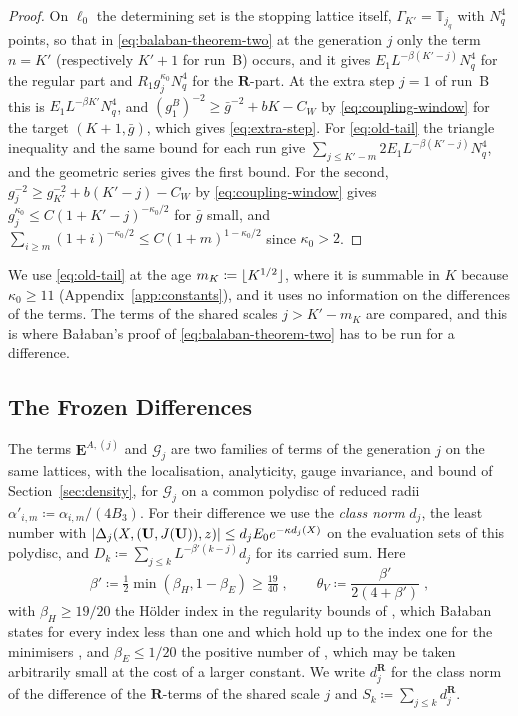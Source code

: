 \documentclass[11pt]{preprint}
\DeclarePairedDelimiter{\abs}{\lvert}{\rvert}
\DeclarePairedDelimiter{\floor}{\lfloor}{\rfloor}
\numberwithin{equation}{section}
\theoremstyle{definition}
\theoremstyle{remark}
\theoremstyle{plain}
\begin{document}
\begin{proof}
On $\ell_0$ the determining set is the stopping lattice itself, $\Gamma_{K'} = \mathbb T_{j_q}$ with $N_q^4$ points, so that in \eqref{eq:balaban-theorem-two} at the generation $j$ only the term $n = K'$ (respectively $K' + 1$ for run~B) occurs, and it gives $E_1L^{-\beta(K'-j)}N_q^4$ for the regular part and $R_1g_j^{\kappa_0}N_q^4$ for the $\mathbf R$-part. At the extra step $j = 1$ of run~B this is $E_1L^{-\beta K'}N_q^4$, and $(g^B_1)^{-2} \geq \bar g^{-2} + bK - C_W$ by \eqref{eq:coupling-window} for the target $(K + 1, \bar g)$, which gives \eqref{eq:extra-step}. For \eqref{eq:old-tail} the triangle inequality and the same bound for each run give $\sum_{j \leq K'-m}2E_1L^{-\beta(K'-j)}N_q^4$, and the geometric series gives the first bound. For the second, $g_j^{-2} \geq g_{K'}^{-2} + b(K' - j) - C_W$ by \eqref{eq:coupling-window} gives $g_j^{\kappa_0} \leq C(1 + K' - j)^{-\kappa_0/2}$ for $\bar g$ small, and $\sum_{i \geq m}(1 + i)^{-\kappa_0/2} \leq C(1 + m)^{1-\kappa_0/2}$ since $\kappa_0 > 2$.
\end{proof}

We use \eqref{eq:old-tail} at the age $m_K \coloneqq \floor{K^{1/2}}$, where it is summable in $K$ because $\kappa_0 \geq 11$ (Appendix~\ref{app:constants}), and it uses no information on the differences of the terms. The terms of the shared scales $j > K' - m_K$ are compared, and this is where Ba{\l}aban's proof of \eqref{eq:balaban-theorem-two} has to be run for a difference.

\subsection{The Frozen Differences}\label{sec:frozen-differences}

The terms $\mathbf E^{A,(j)}$ and $\mathcal G_j$ are two families of terms of the generation $j$ on the same lattices, with the localisation, analyticity, gauge invariance, and bound of Section~\ref{sec:density}, for $\mathcal G_j$ on a common polydisc of reduced radii $\alpha'_{i,m} \coloneqq \alpha_{i,m}/(4B_3)$. For their difference we use the \emph{class norm} $d_j$, the least number with $\abs{\Delta_j(X, (\mathbf U, J(\mathbf U)), z)} \leq d_jE_0e^{-\kappa d_j(X)}$ on the evaluation sets of this polydisc, and $D_k \coloneqq \sum_{j \leq k}L^{-\beta'(k-j)}d_j$ for its carried sum. Here
\begin{equation}\label{eq:age-exponent}
    \beta' \coloneqq \tfrac12\min(\beta_H, 1 - \beta_E) \geq \tfrac{19}{40}\;,
    \qquad
    \theta_V \coloneqq \frac{\beta'}{2(4 + \beta')}\;,
\end{equation}
with $\beta_H \geq 19/20$ the H\"older index in the regularity bounds of \cite[(3.31), p.~276]{BalabanRG1}, which Ba{\l}aban states for every index less than one and which hold up to the index one for the minimisers \cite[Theorem~1, (9), p.~279]{BalabanVAR}, and $\beta_E \leq 1/20$ the positive number of \cite[(3.67), p.~283]{BalabanCRE}, which may be taken arbitrarily small at the cost of a larger constant. We write $d^{\mathbf R}_j$ for the class norm of the difference of the $\mathbf R$-terms of the shared scale $j$ and $S_k \coloneqq \sum_{j \leq k}d^{\mathbf R}_j$.
\end{document}

